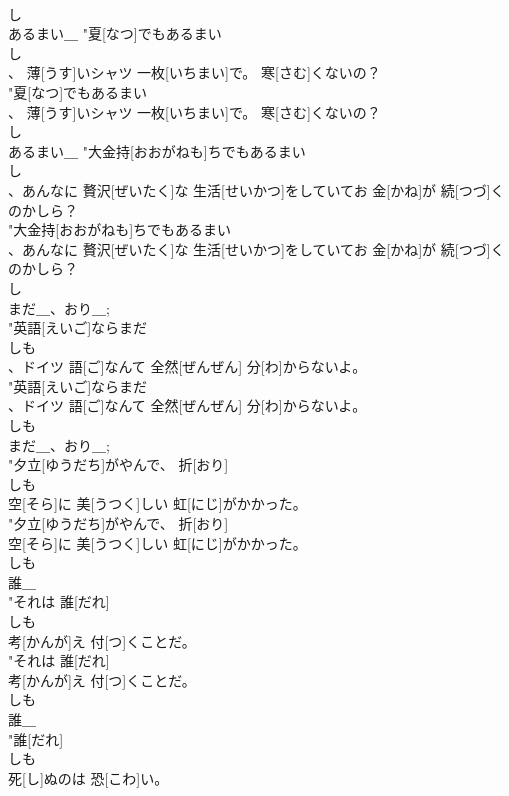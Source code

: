 \documentclass[8pt]{extreport}
\begin{document}
\begin{CJK}{UTF8}{min}
\\	し
\\	あるまい＿	"夏[なつ]でもあるまい
\\	し
\\	、 薄[うす]いシャツ 一枚[いちまい]で。 寒[さむ]くないの？
\\	"夏[なつ]でもあるまい
\\	、 薄[うす]いシャツ 一枚[いちまい]で。 寒[さむ]くないの？
\\	し
\\	あるまい＿	"大金持[おおがねも]ちでもあるまい
\\	し
\\	、あんなに 贅沢[ぜいたく]な 生活[せいかつ]をしていてお 金[かね]が 続[つづ]くのかしら？
\\	"大金持[おおがねも]ちでもあるまい
\\	、あんなに 贅沢[ぜいたく]な 生活[せいかつ]をしていてお 金[かね]が 続[つづ]くのかしら？
\\	し
\\	まだ＿、おり＿; 
\\	"英語[えいご]ならまだ
\\	しも
\\	、ドイツ 語[ご]なんて 全然[ぜんぜん] 分[わ]からないよ。
\\	"英語[えいご]ならまだ
\\	、ドイツ 語[ご]なんて 全然[ぜんぜん] 分[わ]からないよ。
\\	しも
\\	まだ＿、おり＿; 
\\	"夕立[ゆうだち]がやんで、 折[おり]
\\	しも
\\	空[そら]に 美[うつく]しい 虹[にじ]がかかった。
\\	"夕立[ゆうだち]がやんで、 折[おり]
\\	空[そら]に 美[うつく]しい 虹[にじ]がかかった。
\\	しも
\\	誰＿ 
\\	"それは 誰[だれ]
\\	しも
\\	考[かんが]え 付[つ]くことだ。
\\	"それは 誰[だれ]
\\	考[かんが]え 付[つ]くことだ。
\\	しも
\\	誰＿ 
\\	"誰[だれ]
\\	しも
\\	死[し]ぬのは 恐[こわ]い。

\end{CJK}
\end{document}
